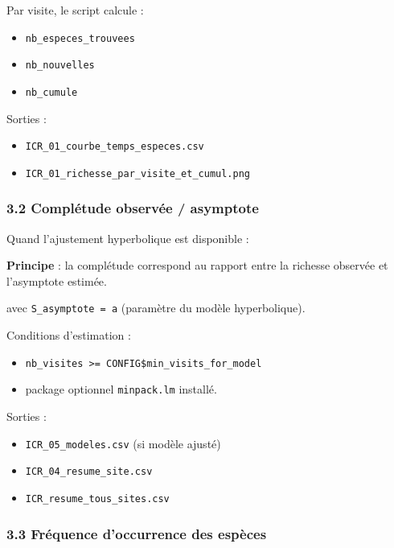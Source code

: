 Par visite, le script calcule :

\begin{itemize}
\tightlist
\item
  \texttt{nb\_especes\_trouvees}
\item
  \texttt{nb\_nouvelles}
\item
  \texttt{nb\_cumule}
\end{itemize}

Sorties :

\begin{itemize}
\tightlist
\item
  \texttt{ICR\_01\_courbe\_temps\_especes.csv}
\item
  \texttt{ICR\_01\_richesse\_par\_visite\_et\_cumul.png}
\end{itemize}

\subsubsection{3.2 Complétude observée /
asymptote}\label{compluxe9tude-observuxe9e-asymptote}

Quand l'ajustement hyperbolique est disponible :

\textbf{Principe} : la complétude correspond au rapport entre la
richesse observée et l'asymptote estimée.

avec \texttt{S\_asymptote\ =\ a} (paramètre du modèle hyperbolique).

Conditions d'estimation :

\begin{itemize}
\tightlist
\item
  \texttt{nb\_visites\ \textgreater{}=\ CONFIG\$min\_visits\_for\_model}
\item
  package optionnel \texttt{minpack.lm} installé.
\end{itemize}

Sorties :

\begin{itemize}
\tightlist
\item
  \texttt{ICR\_05\_modeles.csv} (si modèle ajusté)
\item
  \texttt{ICR\_04\_resume\_site.csv}
\item
  \texttt{ICR\_resume\_tous\_sites.csv}
\end{itemize}

\subsubsection{3.3 Fréquence d'occurrence des
espèces}\label{fruxe9quence-doccurrence-des-espuxe8ces}

